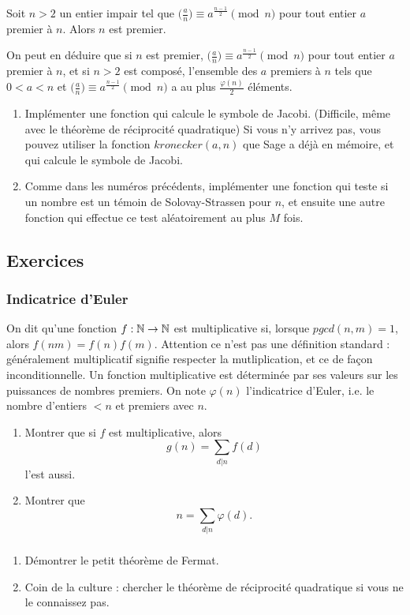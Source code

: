 \begin{thm}
Soit $n>2$ un entier impair tel que $\big(\frac{a}{n}\big)\equiv a^{\frac{n-1}{2}}\pmod n$ pour tout entier $a$ premier à $n$. Alors $n$ est premier. 
\end{thm}

On peut en déduire que si $n$ est premier, $\big(\frac{a}{n}\big)\equiv a^{\frac{n-1}{2}}\pmod n$ pour tout entier $a$ premier à $n$, et si $n>2$ est composé, l'ensemble des $a$ premiers à $n$ tels que $0<a<n$ et $\big(\frac{a}{n}\big)\equiv a^{\frac{n-1}{2}}\pmod n$ a au plus $\frac{\varphi(n)}{2}$ éléments.

\begin{enumerate}
\item Implémenter une fonction qui calcule le symbole de Jacobi. (Difficile, même avec le théorème de réciprocité quadratique) Si vous n'y arrivez pas, vous pouvez utiliser la fonction $kronecker(a,n)$ que Sage a déjà en mémoire, et qui calcule le symbole de Jacobi.
\item Comme dans les numéros précédents, implémenter une fonction qui teste si un nombre est un témoin de Solovay-Strassen pour $n$, et ensuite une autre fonction qui effectue ce test aléatoirement au plus $M$ fois.
\end{enumerate}

\subsection{Exercices}

\subsubsection{Indicatrice d'Euler}

On dit qu'une fonction $f: \mathbb N\rightarrow \mathbb N$ est multiplicative si, lorsque $pgcd(n,m)=1$, alors $f(nm)=f(n)f(m)$. Attention ce n'est pas une définition standard : généralement multiplicatif signifie respecter la mutliplication, et ce de façon inconditionnelle. Un fonction multiplicative est déterminée par ses valeurs sur les puissances de nombres premiers. On note $\varphi(n)$ l'indicatrice d'Euler, i.e. le nombre d'entiers $<n$ et premiers avec $n$.

\begin{enumerate}
\item Montrer que si $f$ est multiplicative, alors 
\[g(n)=\sum_{d|n} f(d)\]
l'est aussi.
\item Montrer que \[n=\sum_{d|n}\varphi(d).\]
\end{enumerate} 

\subsubsection{}

\begin{enumerate}
\item Démontrer le petit théorème de Fermat.
\item Coin de la culture : chercher le théorème de réciprocité quadratique si vous ne le connaissez pas.
\end{enumerate}
